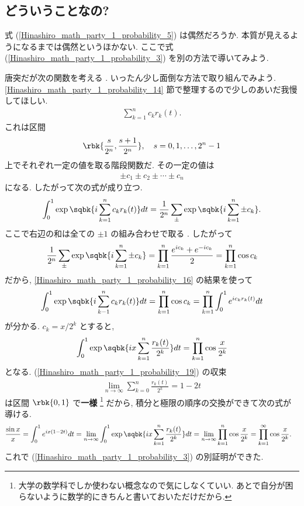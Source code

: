 \documentclass[openany, a4paper, oneside]{jsbook}
\begin{document}
\subsection{どういうことなの?}

式 (\ref{Hinashiro_math_party_1_probability_5}) は偶然だろうか.
本質が見えるようになるまでは偶然というほかない.
ここで式 (\ref{Hinashiro_math_party_1_probability_3}) を別の方法で導いてみよう.

唐突だが次の関数を考える \footnotemark[53]{}.
いったん少し面倒な方法で取り組んでみよう.
\ref{Hinashiro_math_party_1_probability_14} 節で整理するので少しのあいだ我慢してほしい.
\begin{align}
 \sum_{k=1}^{n} c_k r_k (t).
\end{align}
これは区間
\begin{align}
 \rbk{\frac{s}{2^n}, \frac{s+1}{2^n}}, \quad s=0,1, \dots, 2^n -1
\end{align}
上でそれぞれ一定の値を取る階段関数だ.
その一定の値は
\begin{align}
 \pm c_1 \pm c_2 \pm \cdots \pm c_n
\end{align}
になる.
したがって次の式が成り立つ.
\begin{align}
 \int_0^1 \exp \sqbk{i \sum_{k=1}^{n} c_k r_k (t)} dt
 =
 \frac{1}{2^n} \sum_{\pm} \exp \sqbk{ i \sum_{k=1}^n \pm c_k}.
\end{align}
ここで右辺の和は全ての $\pm 1$ の組み合わせで取る \footnotemark[54]{}.
したがって
\begin{align}
 \frac{1}{2^n} \sum_{\pm} \exp \sqbk{ i \sum_{k=1}^n \pm c_k}
 =
 \prod_{k=1}^{n} \frac{e^{ic_k} + e^{-ic_k}}{2}
 =
 \prod_{k=1}^{n} \cos c_k
\end{align}
だから, \ref{Hinashiro_math_party_1_probability_16} の結果を使って
\begin{align}
 \int_0^1 \exp \sqbk{i \sum_{k-1}^n c_k r_k (t)} dt
 =
 \prod_{k=1}^n \cos c_k
 =
 \prod_{k=1}^n \int_0^1 e^{i c_k r_k (t)} dt \label{Hinashiro_math_party_1_probability_6}
\end{align}
が分かる.
$c_k = x / 2^k$ とすると,
\begin{align}
 \int_0^1 \exp \sqbk{ix \sum_{k=1}^n \frac{r_k (t)}{2^k}} dt
 =
 \prod_{k=1}^n \cos \frac{x}{2^k}
\end{align}
となる.
(\ref{Hinashiro_math_party_1_probability_19}) の収束
\begin{align}
 \lim_{n \to \infty} \sum_{k=0}^n \frac{r_k (t)}{2^k}
 =
 1 - 2 t
\end{align}
は区間 $\rbk{0,1}$ で\textbf{一様} \footnote{大学の数学科でしか使わない概念なので気にしなくていい. あとで自分が困らないように数学的にきちんと書いておいただけだから.} だから,
積分と極限の順序の交換ができて次の式が導ける.
\begin{align}
 \frac{\sin x}{x}
 &=
 \int_0^1 e^{ix (1 - 2t)} dt
 =
 \lim_{n \to \infty} \int_0^1 \exp \sqbk{ix \sum_{k=1}^n \frac{r_k (t)}{2^k}} dt
 =
 \lim_{n \to \infty} \prod_{k=1}^n \cos \frac{x}{2^k}
 =
 \prod_{k=1}^{\infty} \cos \frac{x}{2^k}.
\end{align}
これで (\ref{Hinashiro_math_party_1_probability_3}) の別証明ができた.
\end{document}
